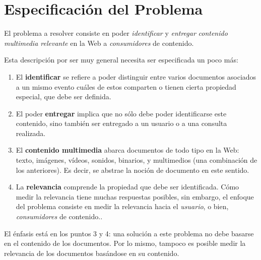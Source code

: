 \chapter{Especificaci\'on del Problema}
\label{sec-1}


  El problema a resolver consiste en poder \emph{identificar} y \emph{entregar}
  \emph{contenido multimedia relevante} en la Web a \emph{consumidores} de
  contenido.

  Esta descripción por ser muy general necesita ser especificada un
  poco más:

\begin{enumerate}
\item El \textbf{identificar} se refiere a poder distinguir entre varios
     documentos asociados a un mismo evento cuáles de estos comparten o
     tienen cierta propiedad especial, que debe ser definida.
\item El poder \textbf{entregar} implica que no sólo debe poder identificarse este
     contenido, sino también ser entregado a un usuario o a una consulta
     realizada.
\item El \textbf{contenido multimedia} abarca documentos de todo tipo en la
     Web: texto, imágenes, vídeos, sonidos, binarios, y multimedios
     (una combinación de los anteriores). Es decir, se abstrae la
     noción de documento en este sentido.
\item La \textbf{relevancia} comprende la propiedad que debe ser
     identificada. Cómo medir la relevancia tiene muchas respuestas
     posibles, sin embargo, el enfoque del problema consiste en medir la
     relevancia hacia el \emph{usuario}, o bien, \emph{consumidores} de
     contenido..
\end{enumerate}
  El énfasis está en los puntos 3 y 4: una solución a este problema no debe
  basarse en el contenido de los documentos. Por lo mismo, tampoco es
  posible medir la relevancia de los documentos basándose en su contenido.